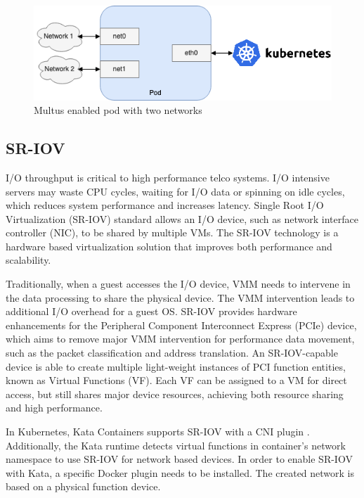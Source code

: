 \begin{figure}[ht]
  \begin{center}
    \includegraphics[width=13.5cm]{images/Multus.png}
    \caption{Multus enabled pod with two networks}
    \label{fig:Multus}
  \end{center}
\end{figure}

\subsection{SR-IOV}
\label{section:SR-IOV}

I/O throughput is critical to high performance telco systems. I/O intensive servers may waste CPU cycles, waiting for I/O data or spinning on idle cycles, which reduces system performance and increases latency. Single Root I/O Virtualization (SR-IOV) standard allows an I/O device, such as network interface controller (NIC), to be shared by multiple VMs. The SR-IOV technology is a hardware based virtualization solution that improves both performance and scalability. \cite{Dong2012}

Traditionally, when a guest accesses the I/O device, VMM needs to intervene in the data processing to share the physical device. The VMM intervention leads to additional I/O overhead for a guest OS. SR-IOV provides hardware enhancements for the Peripheral Component Interconnect Express (PCIe) device, which aims to remove major VMM intervention for performance data movement, such as the packet classification and address translation. An SR-IOV-capable device is able to create multiple light-weight instances of PCI function entities, known as Virtual Functions (VF). Each VF can be assigned to a VM for direct access, but still shares major device resources, achieving both resource sharing and high performance. \cite{Dong2012}

In Kubernetes, Kata Containers supports SR-IOV with a CNI plugin \cite{SR-IOVOpenShift}. Additionally, the Kata runtime detects virtual functions in container's network namespace to use SR-IOV for network based devices. In order to enable SR-IOV with Kata, a specific Docker plugin needs to be installed. The created network is based on a physical function device. \cite{SR-IOVKataContainers}

